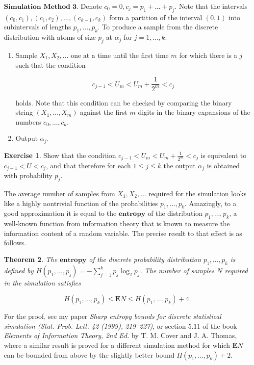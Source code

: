 \documentclass[11pt]{report}
\theoremstyle{plain}
\newtheorem{thm}{Theorem}[chapter]
\theoremstyle{definition}
\newtheorem{xexercise}[thm]{Exercise}
\begin{document}
$\textbf{Simulation Method 3.}$ Denote
$c_0 = 0, c_j = p_1+\ldots+p_j$. Note that the
intervals $(c_0,c_1), (c_1,c_2),\ldots, (c_{k-1},c_k)$
form a partition of the interval $(0,1)$ into
subintervals of lengths $p_1,\ldots,p_k$. To produce
a sample from the discrete distribution with atoms of
size $p_j$ at $\alpha_j$ for $j=1,\ldots,k$:

\begin{enumerate}[label=\arabic*.]
\item Sample $X_1,X_2,\ldots$ one at a time until the first
time $m$ for which there is a $j$ such that the
condition

\[
c_{j-1} < U_m < U_m+\frac{1}{2^m} < c_j
\]

holds. Note that this condition can be checked by
comparing the binary string $(X_1,\ldots,X_m)$
against the first $m$ digits in the binary expansions
of the numbers $c_0,\ldots,c_k$.

\item Output $\alpha_j$.
\end{enumerate}

\begin{xexercise}
Show that the condition
$c_{j-1} < U_m < U_m+\frac{1}{2^m} < c_j$ is
equivalent to $c_{j-1} < U < c_j$, and that therefore
for each $1\le j\le k$ the output $\alpha_j$ is
obtained with probability $p_j$.
\end{xexercise}

The average number of samples from $X_1,X_2,\ldots$
required for the simulation looks like a highly
nontrivial function of the probabilities
$p_1,\ldots,p_k$. Amazingly, to a good approximation
it is equal to the $\textbf{entropy}$ of the
distribution $p_1,\ldots,p_k$, a well-known function
from information theory that is known to measure the
information content of a random variable. The precise
result to that effect is as follows.

\begin{thm}
The $\textbf{entropy}$ of the discrete probability
distribution $p_1,\ldots,p_k$ is defined by
$H(p_1,\ldots,p_j) = -\sum_{j=1}^k p_j \log_2 p_j$.
The number of samples $N$ required in the simulation
satisfies

\[
H(p_1,\ldots,p_k) \le \mathbf{E} N \le H(p_1,\ldots,p_k) + 4.
\]

\end{thm}

For the proof, see my paper \emph{Sharp entropy bounds for
discrete statistical simulation (Stat. Prob. Lett. 42
(1999), 219--227)}, or section 5.11 of the book
\emph{Elements of Information Theory, 2nd Ed.} by T. M.
Cover and J. A. Thomas, where a similar result is
proved for a different simulation method for which
$\mathbf{E} N$ can be bounded from above by the
slightly better bound $H(p_1,\ldots,p_k)+2$.
\end{document}

